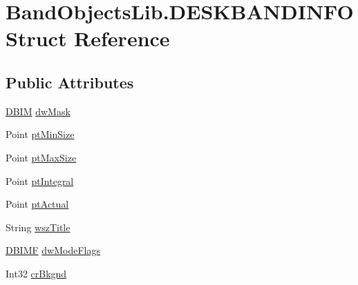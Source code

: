 \hypertarget{struct_band_objects_lib_1_1_d_e_s_k_b_a_n_d_i_n_f_o}{\section{Band\+Objects\+Lib.\+D\+E\+S\+K\+B\+A\+N\+D\+I\+N\+F\+O Struct Reference}
\label{struct_band_objects_lib_1_1_d_e_s_k_b_a_n_d_i_n_f_o}
}
\subsection*{Public Attributes}
\begin{DoxyCompactItemize}
\item 
\hyperlink{namespace_band_objects_lib_a50a5414ef82d3f30087a91038378683d}{D\+B\+I\+M} \hyperlink{struct_band_objects_lib_1_1_d_e_s_k_b_a_n_d_i_n_f_o_ac373909202a295c34b61975b92392a6f}{dw\+Mask}
\item 
Point \hyperlink{struct_band_objects_lib_1_1_d_e_s_k_b_a_n_d_i_n_f_o_af336f90781b4e2adb89e431bb061523b}{pt\+Min\+Size}
\item 
Point \hyperlink{struct_band_objects_lib_1_1_d_e_s_k_b_a_n_d_i_n_f_o_a5ba96da532ea83cb01f0ebcbdace578d}{pt\+Max\+Size}
\item 
Point \hyperlink{struct_band_objects_lib_1_1_d_e_s_k_b_a_n_d_i_n_f_o_a33b8c364d997d10939112344cab721ab}{pt\+Integral}
\item 
Point \hyperlink{struct_band_objects_lib_1_1_d_e_s_k_b_a_n_d_i_n_f_o_ac46e93c7f87cf040192dfdc3c5e610ed}{pt\+Actual}
\item 
String \hyperlink{struct_band_objects_lib_1_1_d_e_s_k_b_a_n_d_i_n_f_o_a4c321fa662cfea35d6050677259b3fc4}{wsz\+Title}
\item 
\hyperlink{namespace_band_objects_lib_a404a4f848406d76dddf221189cea32ca}{D\+B\+I\+M\+F} \hyperlink{struct_band_objects_lib_1_1_d_e_s_k_b_a_n_d_i_n_f_o_a523206c522888a7f04ddd61d7c95ee44}{dw\+Mode\+Flags}
\item 
Int32 \hyperlink{struct_band_objects_lib_1_1_d_e_s_k_b_a_n_d_i_n_f_o_a85c4672c087732087e78c819aff60ce6}{cr\+Bkgnd}
\end{DoxyCompactItemize}


